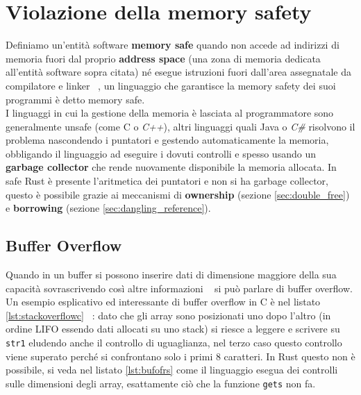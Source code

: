 \documentclass{report}
\begin{document}
\section{Violazione della memory safety}
Definiamo un'entità software \textbf{memory safe} quando non accede ad indirizzi di memoria fuori dal proprio \textbf{address space} (una zona di memoria dedicata all'entità software sopra citata) né esegue istruzioni fuori dall'area assegnatale da compilatore e linker ~\cite{paper:def}, un linguaggio che garantisce la memory safety dei suoi programmi è detto memory safe.\\
I linguaggi in cui la gestione della memoria è lasciata al programmatore sono generalmente unsafe (come C o \textit{C++}), altri linguaggi quali Java o \textit{C\#} risolvono il problema nascondendo i puntatori e gestendo automaticamente la memoria, obbligando il linguaggio ad eseguire i dovuti controlli e spesso usando un \textbf{garbage collector} che rende nuovamente disponibile la memoria allocata. In safe Rust è presente l'aritmetica dei puntatori e non si ha garbage collector, questo è possibile grazie ai meccanismi di \textbf{ownership} (sezione \ref{sec:double_free}) e \textbf{borrowing} (sezione \ref{sec:dangling_reference}).

\subsection{Buffer Overflow} \label{sec:buffer_overflow}
Quando in un buffer si possono inserire dati di dimensione maggiore della sua capacità sovrascrivendo così altre informazioni ~\cite{nist:800} si può parlare di buffer overflow. \\
Un esempio esplicativo ed interessante di buffer overflow in C è nel listato \ref{lst:stackoverflowc} ~\cite[7.5]{stallings:os}: dato che gli array sono posizionati uno dopo l'altro (in ordine LIFO essendo dati allocati su uno stack) si riesce a leggere e scrivere su \texttt{str1} eludendo anche il controllo di uguaglianza, nel terzo caso questo controllo viene superato perché si confrontano solo i primi 8 caratteri. In Rust questo non è possibile, si veda nel listato \ref{lst:bufofrs} come il linguaggio esegua dei controlli sulle dimensioni degli array, esattamente ciò che la funzione \texttt{gets} non fa. 



\end{document}
